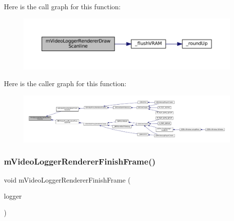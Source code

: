 Here is the call graph for this function\+:
\nopagebreak
\begin{figure}[H]
\begin{center}
\leavevmode
\includegraphics[width=350pt]{video-logger_8c_aae580067601d3fb8deb476d420acf304_cgraph}
\end{center}
\end{figure}
Here is the caller graph for this function\+:
\nopagebreak
\begin{figure}[H]
\begin{center}
\leavevmode
\includegraphics[width=350pt]{video-logger_8c_aae580067601d3fb8deb476d420acf304_icgraph}
\end{center}
\end{figure}
\mbox{\label{video-logger_8c_ae0985d556c5cd2c11d95f3b0c8e820af}} 
\subsubsection{\texorpdfstring{m\+Video\+Logger\+Renderer\+Finish\+Frame()}{mVideoLoggerRendererFinishFrame()}}
{\footnotesize\ttfamily void m\+Video\+Logger\+Renderer\+Finish\+Frame (\begin{DoxyParamCaption}\item[{struct m\+Video\+Logger $\ast$}]{logger }\end{DoxyParamCaption})}

